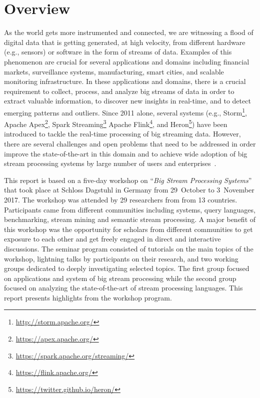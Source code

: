 \section{Overview}\label{sec:overview}

As the world gets more instrumented and connected, we are witnessing a
flood of digital data that is getting generated, at high velocity,
from different hardware (e.g., sensors) or software in the form of
streams of data. Examples of this phenomenon are crucial for several
applications and domains including financial markets, surveillance
systems, manufacturing, smart cities, and scalable monitoring
infrastructure. In these applications and domains, there is a crucial
requirement to collect, process, and analyze big streams of data in
order to extract valuable information, to discover new insights in
real-time, and to detect emerging patterns and outliers. Since 2011
alone, several systems (e.g.,
Storm\footnote{\url{http://storm.apache.org/}},
Apache Apex\footnote{\url{https://apex.apache.org/}},
Spark Streaming\footnote{\url{https://spark.apache.org/streaming/}}
Apache Flink\footnote{\url{https://flink.apache.org/}}, and
Heron\footnote{\url{https://twitter.github.io/heron/}}) have
been introduced to tackle the real-time processing of big streaming
data. However, there are several challenges and open problems that
need to be addressed in order improve the state-of-the-art in this
domain and to achieve wide adoption of big stream processing systems
by large number of users and enterprises~\cite{sakr2016big}.

This report is based on a five-day workshop on ``\emph{Big Stream
  Processing Systems}'' that took place at Schloss Dagstuhl in Germany
from 29~October to 3~November 2017. The workshop was attended by 29
researchers from from 13 countries. Participants came from different
communities including systems, query languages, benchmarking, stream
mining and semantic stream processing. A major benefit of this
workshop was the opportunity for scholars from different communities
to get exposure to each other and get freely engaged in direct and
interactive discussions. The seminar program consisted of tutorials on
the main topics of the workshop, lightning talks by participants on
their research, and two working groups dedicated to deeply
investigating selected topics. The first group focused on applications
and system of big stream processing while the second group focused on
analyzing the state-of-the-art of stream processing languages. This
report presents highlights from the workshop program.
